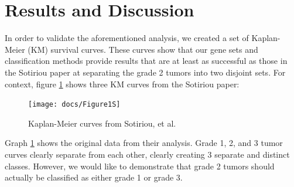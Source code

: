 \documentclass[a4paper,10pt]{article}
\begin{document}
\section{Results and Discussion}

In order to validate the aforementioned analysis, we created a set of Kaplan-Meier 
(KM) survival curves. These curves show that our gene sets and classification 
methods provide results that are at least as successful as those in the Sotiriou 
paper at separating the grade 2 tumors into two disjoint sets. 
For context, figure \ref{1S} shows three KM curves from the Sotiriou paper:
\begin{figure}
\centering
\texttt{[image: docs/Figure1S]}
\caption{Kaplan-Meier curves from Sotiriou, et al.}\label{1S}
\end{figure}
Graph \ref{1S} shows the original data from their analysis. Grade 1, 2, and 3 tumor 
curves clearly separate from each other, clearly creating 3 separate and distinct 
classes. However, we would like to demonstrate that grade 2 tumors should 
actually be classified as either grade 1 or grade 3. \\
\end{document}
